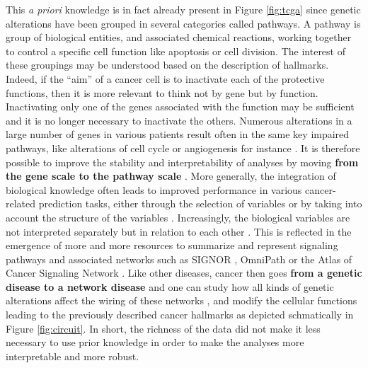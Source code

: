 \documentclass[a4paper,12pt,twoside,onecolumn,openright,final,oldfontcommands]{memoir}
\begin{document}
This \emph{a priori} knowledge is in fact already present in Figure
\ref{fig:tcga} since genetic alterations have been grouped in several
categories called pathways. A pathway is group of biological entities,
and associated chemical reactions, working together to control a
specific cell function like apoptosis or cell division. The interest of
these groupings may be understood based on the description of hallmarks.
Indeed, if the ``aim'' of a cancer cell is to inactivate each of the
protective functions, then it is more relevant to think not by gene but
by function. Inactivating only one of the genes associated with the
function may be sufficient and it is no longer necessary to inactivate
the others. Numerous alterations in a large number of genes in various
patients result often in the same key impaired pathways, like
alterations of cell cycle or angiogenesis for instance
\citep{jones2008core}. It is therefore possible to improve the stability
and interpretability of analyses by moving \textbf{from the gene scale
to the pathway scale} \citep{drier2013pathway}. More generally, the
integration of biological knowledge often leads to improved performance
in various cancer-related prediction tasks, either through the selection
of variables or by taking into account the structure of the variables
\citep{bilal2013improving, ferranti2017value}. Increasingly, the
biological variables are not interpreted separately but in relation to
each other \citep{barabasi2004network}. This is reflected in the
emergence of more and more resources to summarize and represent
signaling pathways and associated networks such as SIGNOR
\citep{perfetto2016signor}, OmniPath \citep{turei2016omnipath} or the
Atlas of Cancer Signaling Network \citep{kuperstein2015atlas}. Like
other diseases, cancer then goes \textbf{from a genetic disease to a
network disease} \citep{del2010diseases} and one can study how all kinds
of genetic alterations affect the wiring of these networks
\citep{pawson2007oncogenic}, and modify the cellular functions leading
to the previously described cancer hallmarks as depicted schmatically in
Figure \ref{fig:circuit}. In short, the richness of the data did not
make it less necessary to use prior knowledge in order to make the
analyses more interpretable and more robust.
\end{document}
